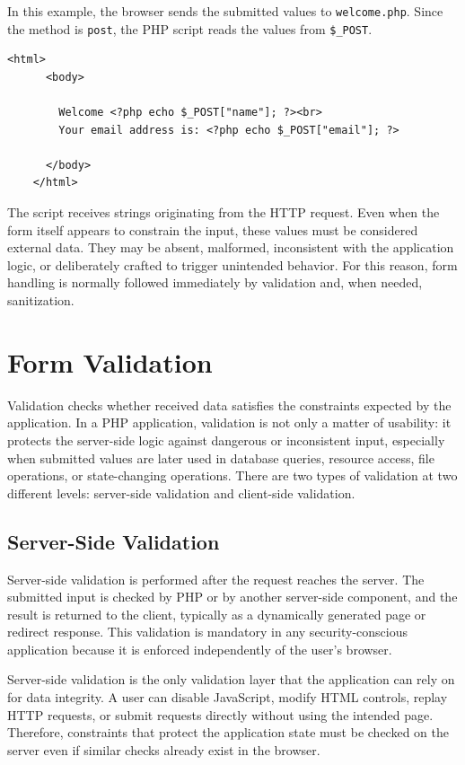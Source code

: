\documentclass{scrbook}
\begin{document}
	In this example, the browser sends the submitted values to \texttt{welcome.php}. Since the method is \texttt{post}, the PHP script reads the values from \texttt{\$\_POST}.
	
	\begin{lstlisting}[caption={welcome.php}]
	<html>
	  <body>
		
		Welcome <?php echo $_POST["name"]; ?><br>
		Your email address is: <?php echo $_POST["email"]; ?>
		
	  </body>
	</html>
	\end{lstlisting}
	
	The script receives strings originating from the HTTP request. Even when the form itself appears to constrain the input, these values must be considered external data. They may be absent, malformed, inconsistent with the application logic, or deliberately crafted to trigger unintended behavior. For this reason, form handling is normally followed immediately by validation and, when needed, sanitization.
	
	\section{Form Validation}
	
	Validation checks whether received data satisfies the constraints expected by the application. In a PHP application, validation is not only a matter of usability: it protects the server-side logic against dangerous or inconsistent input, especially when submitted values are later used in database queries, resource access, file operations, or state-changing operations. There are two types of validation at two different levels: server-side validation and client-side validation.
	
	\subsection{Server-Side Validation}
	
	Server-side validation is performed after the request reaches the server. The submitted input is checked by PHP or by another server-side component, and the result is returned to the client, typically as a dynamically generated page or redirect response. This validation is mandatory in any security-conscious application because it is enforced independently of the user's browser.
	
	Server-side validation is the only validation layer that the application can rely on for data integrity. A user can disable JavaScript, modify HTML controls, replay HTTP requests, or submit requests directly without using the intended page. Therefore, constraints that protect the application state must be checked on the server even if similar checks already exist in the browser.
	
\end{document}
